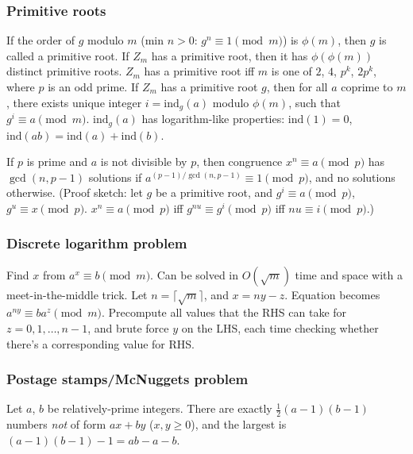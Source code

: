 {%

\subsubsection{Primitive roots}  If the order of $g$ modulo $m$ (min $n>0$:
$g^n \equiv 1 \pmod{m}$) is $\phi(m)$, then $g$ is called a primitive root.
If $Z_m$ has a primitive root, then it has $\phi(\phi(m))$ distinct primitive
roots. $Z_m$ has a primitive root iff $m$ is one of $2$, $4$,
$p^k$, $2p^k$, where $p$ is an odd prime.
If $Z_m$ has a primitive root $g$, then for all $a$ coprime to $m$,
there exists unique integer $i=\text{ind}_g(a)$ modulo $\phi(m)$,
such that $g^i \equiv a \pmod{m}$.
$\text{ind}_g(a)$ has logarithm-like properties:
$\text{ind}(1) = 0$, $\text{ind}(ab) = \text{ind}(a) + \text{ind}(b)$.

If $p$ is prime and $a$ is not divisible by $p$, then congruence
$x^n \equiv a \pmod{p}$ has $\gcd(n, p-1)$ solutions if
$a^{(p-1)/\gcd(n,p-1)} \equiv 1 \pmod{p}$, and no solutions otherwise.
(Proof sketch: let $g$ be a primitive root, and
$g^i \equiv a \pmod{p}$, $g^u \equiv x \pmod{p}$.
$x^n \equiv a \pmod{p}$ iff $g^{nu} \equiv g^i \pmod{p}$ iff $nu \equiv i \pmod{p}$.)

\subsubsection{Discrete logarithm problem}  Find $x$ from $a^x \equiv b \pmod{m}$.
Can be solved in $O(\sqrt{m})$ time and space with a meet-in-the-middle trick.
Let $n = \lceil \sqrt{m} \rceil$, and $x = ny - z$.
Equation becomes $a^{ny} \equiv b a^z \pmod{m}$.  Precompute all values that
the RHS can take for $z = 0, 1, \dots, n-1$, and brute force $y$ on the LHS,
each time checking whether there's a corresponding value for RHS.

\subsubsection{Postage stamps/McNuggets problem}  Let $a$, $b$ be relatively-prime integers.
There are exactly $\frac{1}{2}(a-1)(b-1)$ numbers \emph{not} of form $ax+by$ ($x,y \ge 0$),
and the largest is $(a-1)(b-1)-1 = ab - a - b$.

}
